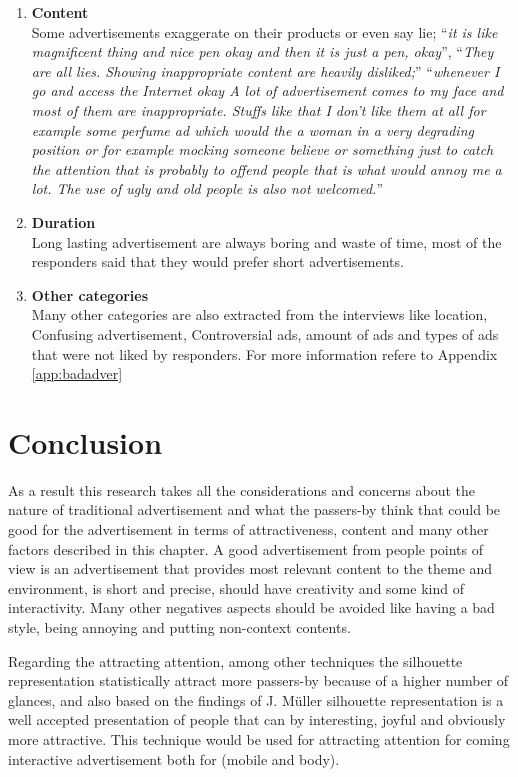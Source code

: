 \begin{enumerate}
\item \textbf{Content} \\
Some advertisements exaggerate on their products or even say lie; ``\emph{it is like magnificent thing and nice pen okay and then it is just a pen, okay}'', ``\emph{They are all lies. Showing inappropriate content are heavily disliked;}'' ``\emph{whenever I go and access the Internet okay A lot of advertisement comes to my face and most of them are inappropriate.
Stuffs like that I don't like them at all for example some perfume ad which would the a woman in a very degrading position or for example mocking someone believe or something just to catch the attention that is probably to offend people that is what would annoy me a lot. The use of ugly and old people is also not welcomed.}''

\item \textbf{Duration} \\
Long lasting advertisement are always boring and waste of time, most of the responders said that they would prefer short advertisements.

\item \textbf{Other categories} \\
Many other categories are also extracted from the interviews like location, Confusing advertisement, Controversial ads, amount of ads and types of ads that were not liked by responders. For more information refere to Appendix \ref{app:badadver} 

\end{enumerate}

\section{Conclusion} 
As a result this research takes all the considerations and concerns about the nature of traditional advertisement and what the passers-by think that could be good for the advertisement in terms of attractiveness, content and many other factors described in this chapter. A good advertisement from people points of view is an advertisement that provides most relevant content to the theme and environment, is short and precise, should have creativity and some kind of interactivity. Many other negatives aspects should be avoided like having a bad style, being annoying and putting non-context contents.

Regarding the attracting attention, among other techniques the silhouette representation statistically attract more passers-by because of a higher number of glances, and also based on the findings of J. Müller\cite{LookingGlass} silhouette representation is a well accepted presentation of people that can by interesting, joyful and obviously more attractive. This technique would be used for attracting attention for coming interactive advertisement both for (mobile and body). 



